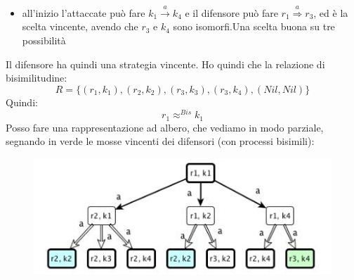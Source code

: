 \documentclass[a4paper,12pt, oneside]{book}
\begin{document}
\begin{esempio}
\begin{itemize}
    \item all'inizio l'attaccate può fare $k_1\stackrel{a}{\rightarrow}k_4$
    e il difensore può fare $r_1\stackrel{a}{\Rightarrow}r_3$, ed è la scelta
    vincente, avendo che $r_3$ e $k_4$ sono isomorfi.Una scelta buona su tre
    possibilità 
  \end{itemize}
  Il difensore ha quindi una strategia vincente.
  Ho quindi che la relazione di bisimilitudine:
  \[R=\{(r_1,k_1),(r_2,k_2),(r_3,k_3),(r_3,k_4),(Nil,Nil)\}\]
  Quindi:
  \[r_1\approx^{Bis} k_1\]
  \newpage
  Posso fare una rappresentazione ad albero, che vediamo in modo parziale,
  segnando in verde le mosse vincenti dei difensori (con processi bisimili):
    \begin{figure}[H]
    \centering
    \includegraphics[scale = 0.6]{img/alb1.jpg}
  \end{figure}
\end{esempio}
\end{document}
